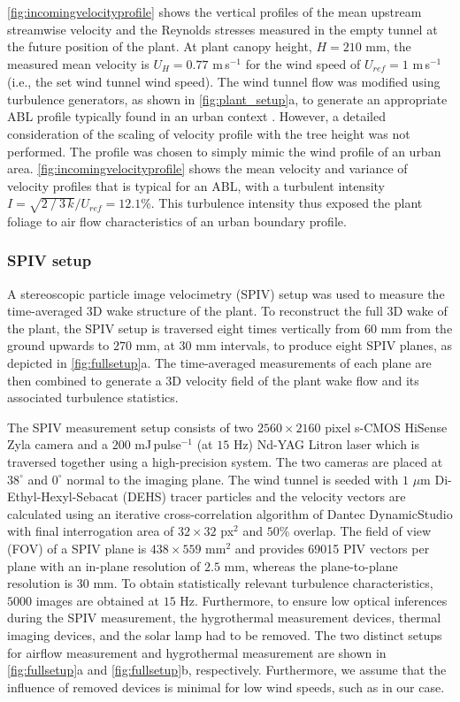 \cref{fig:incomingvelocityprofile} shows the vertical profiles of the mean upstream streamwise velocity and the Reynolds stresses measured in the empty tunnel at the future position of the plant. At plant canopy height,  $H=210$ mm, the measured mean velocity is $U_H=0.77$ m\,s$^{-1}$  for the wind speed of $U_{\textit{ref}}=1$ m\,s$^{-1}$ (i.e., the set wind tunnel wind speed). The wind tunnel flow was modified using turbulence generators, as shown in \cref{fig:plant_setup}a, to generate an appropriate ABL profile typically found in an urban context \citep{Tsalicoglou2018}. However, a detailed consideration of the scaling of velocity profile with the tree height was not performed. The profile was chosen to simply mimic the wind profile of an urban area. \cref{fig:incomingvelocityprofile} shows the mean velocity and variance of velocity profiles that is typical for an ABL, with a turbulent intensity $I=\sqrt{2⁄3\,k}/U_{\textit{ref}}= 12.1$\%. This turbulence intensity thus exposed the plant foliage to air flow characteristics of an urban boundary profile. 


\subsubsection*{SPIV setup}
A stereoscopic particle image velocimetry (SPIV) setup was used to measure the time-averaged 3D wake structure of the plant. To reconstruct the full 3D wake of the plant, the SPIV setup is traversed eight times vertically from $60$ mm from the ground upwards to $270$ mm, at $30$ mm intervals, to produce eight SPIV planes, as depicted in \cref{fig:fullsetup}a. The time-averaged measurements of each plane are then combined to generate a 3D velocity field of the plant wake flow and its associated turbulence statistics. 

The SPIV measurement setup consists of two $2560 \times 2160$ pixel s-CMOS HiSense Zyla camera and a $200$ mJ\,pulse$^{-1}$ (at $15$ Hz) Nd-YAG Litron laser which is traversed together using a high-precision system. The two cameras are placed at $38^{\circ}$ and $0^{\circ}$ normal to the imaging plane. The wind tunnel is seeded with $1$ $\mu$m Di-Ethyl-Hexyl-Sebacat (DEHS) tracer particles and the velocity vectors are calculated using an iterative cross-correlation algorithm of Dantec DynamicStudio with final interrogation area of $32\times32$ px$^2$ and $50$\%  overlap. The field of view (FOV) of a SPIV plane is $438\times559$ mm$^2$ and provides \num{69015} PIV vectors per plane with an in-plane resolution of $2.5$ mm, whereas the plane-to-plane resolution is $30$ mm. To obtain statistically relevant turbulence characteristics, $\num{5000}$ images are obtained at $15$ Hz. Furthermore, to ensure low optical inferences during the SPIV measurement, the hygrothermal measurement devices, thermal imaging devices, and the solar lamp had to be removed. The two distinct setups for airflow measurement and hygrothermal measurement are shown in \cref{fig:fullsetup}a and \cref{fig:fullsetup}b, respectively. Furthermore, we assume that the influence of removed devices is minimal for low wind speeds, such as in our case.

